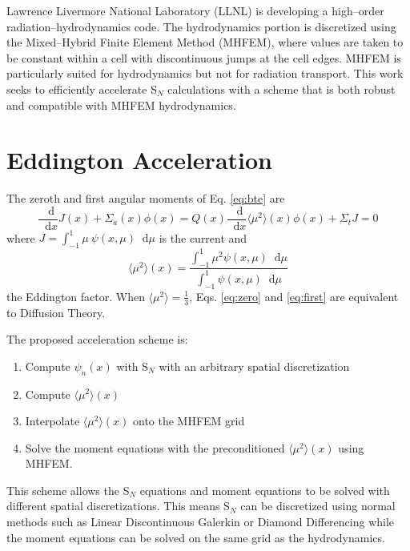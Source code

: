 \documentclass{anstrans}
\newcommand{\SN}{S$_N$\xspace}
\newcommand{\ud}{\mathop{}\!\mathrm{d}} %
\newcommand{\dderiv}[2]{\frac{\ud #1}{\ud #2}}
\newcommand{\edd}{\langle \mu^2 \rangle}
\begin{document}
	Lawrence Livermore National Laboratory (LLNL) is developing a high--order radiation--hydrodynamics code. The hydrodynamics portion is discretized using the Mixed--Hybrid Finite Element Method (MHFEM), where values are taken to be constant within a cell with discontinuous jumps at the cell edges. MHFEM is particularly suited for hydrodynamics but not for radiation transport. This work seeks to efficiently accelerate \SN calculations with a scheme that is both robust and compatible with MHFEM hydrodynamics. 

\section{Eddington Acceleration}
	The zeroth and first angular moments of Eq. \ref{eq:bte} are 
		\begin{subequations} 
		\begin{equation} \label{eq:zero}
			\dderiv{}{x} J(x) + \Sigma_a(x) \phi(x) = Q(x) 
		\end{equation} 
		\begin{equation} \label{eq:first}
			\frac{\ud}{\ud x} \edd(x) \phi(x) + \Sigma_t J = 0  
		\end{equation}
		\end{subequations}
	where $J = \int_{-1}^{1} \mu \ \psi(x, \mu) \ud \mu$ is the current and 
		\begin{equation} \label{eq:eddington} 
			\edd(x) = \frac{\int_{-1}^1 \mu^2 \psi(x, \mu) \ud \mu}{\int_{-1}^1 \psi(x, \mu) \ud \mu}
		\end{equation}
	the Eddington factor. When $\edd = \frac{1}{3}$, Eqs. \ref{eq:zero} and \ref{eq:first} are equivalent to Diffusion Theory. 

	The proposed acceleration scheme is: 
		\begin{enumerate}
			\item Compute $\psi_n(x)$ with \SN with an arbitrary spatial discretization
			\item Compute $\edd(x)$ 
			\item Interpolate $\edd(x)$ onto the MHFEM grid 
			\item Solve the moment equations with the preconditioned $\edd(x)$ using MHFEM. 
		\end{enumerate}
	This scheme allows the \SN equations and moment equations to be solved with different spatial discretizations. This means \SN can be discretized using normal methods such as Linear Discontinuous Galerkin or Diamond Differencing while the moment equations can be solved on the same grid as the hydrodynamics. 
\end{document}
